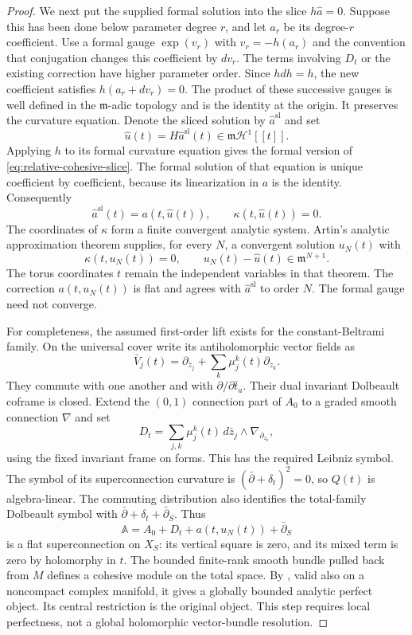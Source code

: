 \documentclass[11pt]{article}
\theoremstyle{definition}
\theoremstyle{remark}
\begin{document}
\begin{proof}
We next put the supplied formal solution into the slice
$h\widehat a=0$.  Suppose this has been done below parameter
degree $r$, and let $a_r$ be its degree-$r$ coefficient.  Use a
formal gauge $\exp(v_r)$ with $v_r=-h(a_r)$ and the convention
that conjugation changes this coefficient by $dv_r$.
The terms involving $D_t$ or the existing correction have higher
parameter order.  Since $hdh=h$, the new coefficient satisfies
$h(a_r+dv_r)=0$.  The product of these successive gauges is
well defined in the $\mathfrak m$-adic topology and is the identity
at the origin.  It preserves the curvature equation.  Denote the
sliced solution by $\widehat a^{\mathrm{sl}}$ and set
\[
 \widehat u(t)=H\widehat a^{\mathrm{sl}}(t)
               \in\mathfrak m\mathcal H^1[[t]].
\]
Applying $h$ to its formal curvature equation gives the formal
version of \eqref{eq:relative-cohesive-slice}.  The formal solution
of that equation is unique coefficient by coefficient, because
its linearization in $a$ is the identity.  Consequently
\[
 \widehat a^{\mathrm{sl}}(t)=a(t,\widehat u(t)),
 \qquad \kappa(t,\widehat u(t))=0.
\]
The coordinates of $\kappa$ form a finite convergent analytic
system.  Artin's analytic approximation theorem
\cite[Theorem~1.2, p.~277]{ArtinAnalytic} supplies, for every $N$,
a convergent solution $u_N(t)$ with
\[
 \kappa(t,u_N(t))=0,\qquad
 u_N(t)-\widehat u(t)\in\mathfrak m^{N+1}.
\]
The torus coordinates $t$ remain the independent variables in
that theorem.  The correction $a(t,u_N(t))$ is flat and agrees
with $\widehat a^{\mathrm{sl}}$ to order $N$.  The formal gauge
need not converge.

For completeness, the assumed first-order lift exists for the
constant-Beltrami family.  On the universal cover write its
antiholomorphic vector fields as
\[
 \bar V_j(t)=\partial_{\bar z_j}
                   +\sum_k\mu_j^k(t)\partial_{z_k}.
\]
They commute with one another and with
$\partial/\partial\bar t_a$.  Their dual invariant
Dolbeault coframe is closed.  Extend the $(0,1)$ connection part
of $A_0$ to a graded smooth connection $\nabla$ and set
\[
 D_t=\sum_{j,k}\mu_j^k(t)\,d\bar z_j\wedge
                         \nabla_{\partial_{z_k}},
\]
using the fixed invariant frame on forms.  This has the required
Leibniz symbol.  The symbol of its superconnection curvature is
$(\bar\partial+\delta_t)^2=0$, so $Q(t)$ is algebra-linear.
The commuting distribution also identifies the total-family
Dolbeault symbol with $\bar\partial+\delta_t+\bar\partial_S$.
Thus
\[
 \mathbb A=A_0+D_t+a(t,u_N(t))+\bar\partial_S
\]
is a flat superconnection on $X_S$: its vertical square is zero,
and its mixed term is zero by holomorphy in $t$.  The bounded
finite-rank smooth bundle pulled back from $M$ defines a cohesive
module on the total space.  By
\cite[Theorem~8.3]{CHLCohesive}, valid also on a noncompact
complex manifold, it gives a globally bounded analytic perfect
object.  Its central restriction is the original object.  This
step requires local perfectness, not a global holomorphic
vector-bundle resolution.


\end{proof}
\end{document}
